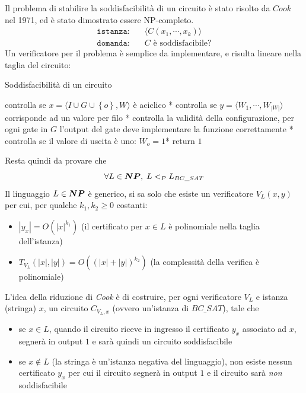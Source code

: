 Il problema di stabilire la soddisfacibilità di un circuito è stato risolto da $Cook$ nel 1971, ed è stato dimostrato essere NP-completo.
\begin{align*}
    \texttt{istanza:} \quad & \langle  C \left( x_1, \cdots, x_k \right)  \rangle \\
    \texttt{domanda:} \quad & C \text{ è soddisfacibile?}
\end{align*}
Un verificatore per il problema è semplice da implementare, e risulta lineare nella taglia del circuito:
\begin{algorithm}[H]
\caption{Soddisfacibilità di un circuito}\label{alg:cooksoddisfa}
\begin{algorithmic}[1]
        \State * controlla se $x = \langle  I \cup G \cup \left\{ o \right\}, W  \rangle$ è aciclico *
        \State * controlla se $y = 
        \langle
        W_1, \cdots, W_{|W|}
        \rangle
        $ corrisponde ad un valore per filo *
        \State * controlla la validità della configurazione, per ogni gate in $G$ l'output del gate deve implementare la funzione correttamente *
        \State * controlla se il valore di uscita è uno: $W_o = 1$*
        \State return $1$
    \EndProcedure
\end{algorithmic}
\end{algorithm}
\noindent
Resta quindi da provare che 
$$
\forall L \in \bm{NP}, \; L <_P L_{BC\_SAT}
$$
Il linguaggio $L \in \bm{NP}$ è generico, si sa solo che esiste un verificatore $V_L(x,y)$ per cui, per qualche $k_1, k_2 \geq 0$ costanti:
\begin{itemize}
    \item $|y_x| = O (|x|^{k_1})$ (il certificato per $x \in L$ è polinomiale nella taglia dell'istanza)
    \item $ T_{V_{L}} (|x|, |y|) = O \left( \left( |x|+|y| \right)^{k_{2}} \right)$ 
        (la complessità della verifica è polinomiale)
\end{itemize}
\noindent
L'idea della riduzione di \emph{Cook} è di costruire, per ogni verificatore $V_L$ e istanza (stringa) $x$, un circuito $C_{V_L,x}$ (ovvero un'istanza di $BC\_SAT$), tale che
\begin{itemize}
    \item se $x \in L$, quando il circuito riceve in ingresso il certificato $y_x$ associato ad $x$, segnerà in output $1$ e sarà quindi un circuito soddisfacibile
    \item se $x \notin L$ (la stringa è un'istanza negativa del linguaggio), non esiste nessun certificato $y_x$ per cui il circuito segnerà in output $1$ e il circuito sarà \emph{non} soddisfacibile
\end{itemize}

